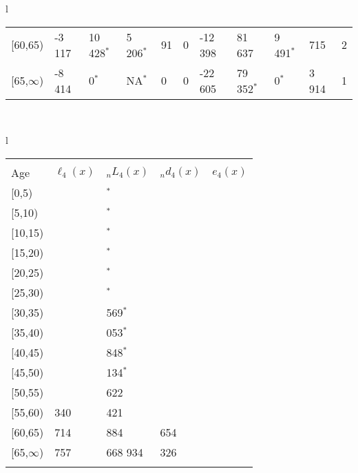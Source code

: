 \documentclass[
]{article}
\begin{document}
\begin{table}
\begin{tabular}[t]{l}
\begin{tabular}
{}[60,65) & -3 117 & 10 428$^{*}$ & 5 206$^{*}$ & 91 & 0 & -12 398 & 81 637 & 9 491$^{*}$ & 715 & 2\\
{}[65,$\infty$) & -8 414 & 0$^{*}$ & NA$^{*}$ & 0 & 0 & -22 605 & 79 352$^{*}$ & 0$^{*}$ & 3 914 & 1\\
\end{tabular}\\
\end{tabular}
\centering
\begin{tabular}[t]{l}
\hline
\begin{tabular}{>{\raggedright\arraybackslash}p{.43in}>{\raggedleft\arraybackslash}p{1.3in}>{\raggedleft\arraybackslash}p{1.3in}>{\raggedleft\arraybackslash}p{1.3in}>{\raggedleft\arraybackslash}p{1.3in}}
\toprule
\multicolumn{1}{c}{ } & \multicolumn{4}{c}{(4) Lost both} \\
\cmidrule(l{3pt}r{3pt}){2-5}
Age & $\ell_{4}(x)$ & ${}_nL_{4}(x)$ & ${}_nd_{4}(x)$ & $e_{4}(x)$\\
\midrule
{}[0,5) & 0 & 0$^{*}$ & 0 & 23\\
{}[5,10) & 0 & 0$^{*}$ & 0 & 23\\
{}[10,15) & 0 & 0$^{*}$ & 0 & 24\\
{}[15,20) & 0 & 0$^{*}$ & 0 & 24\\
{}[20,25) & 0 & 0$^{*}$ & 0 & 24\\
\addlinespace
{}[25,30) & 0 & 0$^{*}$ & 0 & 24\\
{}[30,35) & 0 & 13 569$^{*}$ & 10 & 24\\
{}[35,40) & -10 & 22 053$^{*}$ & 23 & 24\\
{}[40,45) & -33 & 19 848$^{*}$ & 28 & 24\\
{}[45,50) & -60 & 45 134$^{*}$ & 100 & 24\\
\addlinespace
{}[50,55) & -160 & 138 622 & 494 & 23\\
{}[55,60) & 28 340 & 129 421 & 700 & 22\\
{}[60,65) & 37 714 & 302 884 & 2 654 & 21\\
{}[65,$\infty$) & 49 757 & 1 668 934 & 82 326 & 19\\
\bottomrule
\multicolumn{5}{l}{\rule{0pt}{1em}\textsuperscript{*} Based on an estimated from SIPP with less than 10 respondents in the numerator.}\\
\end{tabular}\\
\end{tabular}
\end{table}
\end{document}
